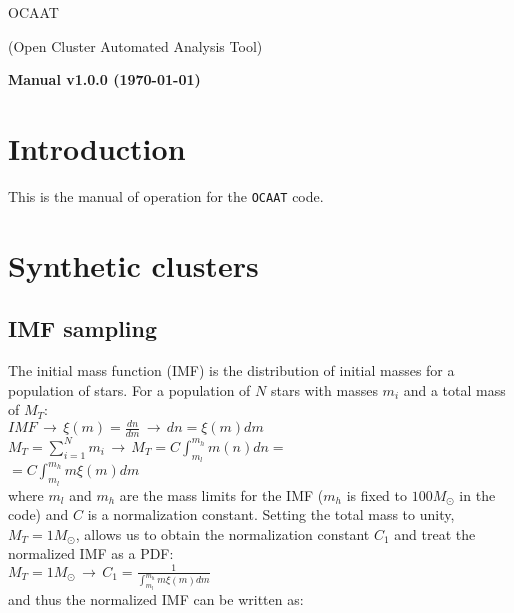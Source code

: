 \documentclass[10pt]{article}
\begin{document}
\begin{center}
\begin{Huge}
OCAAT\\
\end{Huge}
{\huge (Open Cluster Automated Analysis Tool)\\}
\vspace{1cm}
\begin{Large}
\textbf{Manual v1.0.0 (\today)}
\end{Large}
\end{center}

\clearpage

\section{Introduction}
This is the manual of operation for the \texttt{OCAAT} code.

\section{Synthetic clusters}

\subsection{IMF sampling}

The initial mass function (IMF) is the distribution of initial masses for a population
of stars. For a population of $N$ stars with masses $m_i$ and a total mass of $M_T$:\\

$IMF \, \rightarrow \, \xi(m)=\frac{dn}{dm} \, \rightarrow \,dn = \xi(m)dm$\\

$M_T= \sum_{i=1}^N m_i \, \rightarrow \, M_T = C\int_{m_l}^{m_h} m(n)dn = $\\

$= C\int_{m_l}^{m_h} m\xi(m)dm$\\

\noindent where $m_l$ and $m_h$ are the mass limits for the IMF ($m_h$ is fixed to
$100 M_{\odot}$ in the code) and $C$ is a normalization constant. Setting the total
mass to unity, $M_T=1 M_{\odot}$, allows us to obtain the normalization constant $C_1$
and treat the normalized IMF as a PDF:\\

$M_T=1M_{\odot}\, \rightarrow \, C_1 = \frac{1}{\int_{m_l}^{m_h} m\xi(m)dm}$\\

\noindent and thus the normalized IMF can be written as:\\
\end{document}
